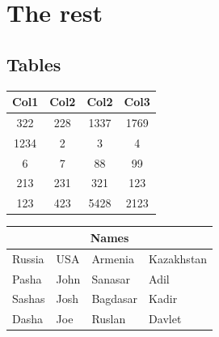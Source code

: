 \documentclass[10pt,a4paper]{report}
\begin{document}
\clearpage
\chapter{The rest}
\section{Tables}
\begin{center}
\begin{tabular}{||c c c c||} 
 \hline
 Col1 & Col2 & Col2 & Col3 \\ [1ex] 
 \hline\hline
 322 & 228 & 1337 & 1769 \\ 
 \hline
 1234 & 2 & 3 & 4 \\
 \hline
 6 & 7 & 88 & 99 \\
 \hline
 213 & 231 & 321 & 123 \\
 \hline
 123 & 423 & 5428 & 2123 \\ [1ex] 
 \hline
\end{tabular}
\end{center}
\begin{tabular}{ |p{2cm}||p{2cm}|p{2cm}|p{2cm}|  }
 \hline
 \multicolumn{4}{|c|}{Names} \\
 \hline
 Russia& USA&Armenia&Kazakhstan\\
 \hline
 Pasha  & John    &Sanasar&   Adil\\
 Sashas&   Josh  & Bagdasar & Kadir\\
 Dasha &Joe & Ruslan&  Davlet\\
 \hline
\end{tabular}



  
\end{document}

